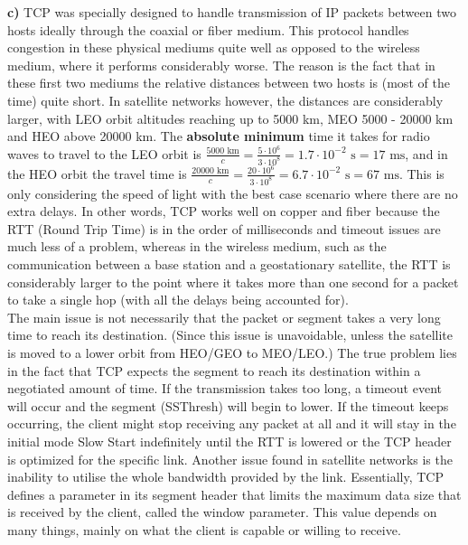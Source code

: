 \large\textbf{c)} \normalsize
TCP was specially designed to handle transmission of IP packets between two hosts ideally through the coaxial or fiber medium. This protocol handles congestion in these physical mediums quite well as opposed to the wireless medium, where it performs considerably worse. The reason is the fact that in these first two mediums the relative distances between two hosts is (most of the time) quite short. In satellite networks however, the distances are considerably larger, with LEO orbit altitudes reaching up to 5000 km, MEO 5000 - 20000 km and HEO above 20000 km\autocite{book1_pp30}. The \textbf{absolute minimum} time it takes for radio waves to travel to the LEO orbit is $\frac{5000 \text{ km}}{c} = \frac{5\cdot 10^6}{3\cdot 10^8} = 1.7\cdot 10^{-2} \text{ s} = 17 \text{ ms}$, and in the HEO orbit the travel time is $\frac{20000 \text{ km}}{c} = \frac{20\cdot 10^6}{3\cdot 10^8} = 6.7\cdot 10^{-2} \text{ s} = 67 \text{ ms}$. This is only considering the speed of light with the best case scenario where there are no extra delays. In other words, TCP works well on copper and fiber because the RTT (Round Trip Time) is in the order of milliseconds and timeout issues are much less of a problem, whereas in the wireless medium, such as the communication between a base station and a geostationary satellite, the RTT is considerably larger to the point where it takes more than one second for a packet to take a single hop (with all the delays being accounted for).\\

The main issue is not necessarily that the packet or segment takes a very long time to reach its destination. (Since this issue is unavoidable, unless the satellite is moved to a lower orbit from HEO/GEO to MEO/LEO.) The true problem lies in the fact that TCP expects the segment to reach its destination within a negotiated amount of time. If the transmission takes too long, a timeout event will occur and the segment  (SSThresh) will begin to lower. If the timeout keeps occurring, the client might stop receiving any packet at all and it will stay in the initial mode Slow Start indefinitely until the RTT is lowered or the TCP header is optimized for the specific link. Another issue found in satellite networks is the inability to utilise the whole bandwidth provided by the link. Essentially, TCP defines a parameter in its segment header that limits the maximum data size that is received by the client, called the window parameter. This value depends on many things, mainly on what the client is capable or willing to receive.\\

